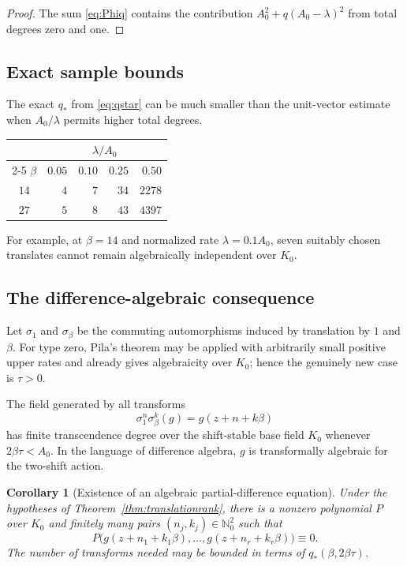 \documentclass[11pt,oneside]{article}
\newtheorem{corollary}[theorem]{Corollary}
\theoremstyle{definition}
\theoremstyle{remark}
\newcommand{\Nzero}{\mathbb N_0}
\begin{document}
\begin{proof}
The sum \eqref{eq:Phiq} contains the contribution
$A_0^2+q(A_0-\lambda)^2$ from total degrees zero and one.
\end{proof}

\subsection{Exact sample bounds}

The exact $q_*$ from \eqref{eq:qstar} can be much smaller than the unit-vector estimate
when $A_0/\lambda$ permits higher total degrees.

\begin{center}
\begin{tabular}{@{}crrrr@{}}
\toprule
& \multicolumn{4}{c}{$\lambda/A_0$}\\
\cmidrule(l){2-5}
$\beta$ & $0.05$ & $0.10$ & $0.25$ & $0.50$\\
\midrule
$14$ & $4$ & $7$ & $34$ & $2278$\\
$27$ & $5$ & $8$ & $43$ & $4397$\\
\bottomrule
\end{tabular}
\end{center}

For example, at $\beta=14$ and normalized rate $\lambda=0.1A_0$, seven suitably chosen
translates cannot remain algebraically independent over $K_0$.

\subsection{The difference-algebraic consequence}

Let $\sigma_1$ and $\sigma_\beta$ be the commuting automorphisms induced by translation by
$1$ and $\beta$.  For type zero, Pila's theorem may be applied with arbitrarily small positive upper rates and already gives algebraicity over $K_0$; hence the genuinely new case is $\tau>0$.

The field generated by all transforms
\[
 \sigma_1^n\sigma_\beta^k(g)=g(z+n+k\beta)
\]
has finite transcendence degree over the shift-stable base field $K_0$ whenever
$2\beta\tau<A_0$.  In the language of difference algebra, $g$ is transformally algebraic
for the two-shift action.

\begin{corollary}[Existence of an algebraic partial-difference equation]
\label{cor:algdifference}
Under the hypotheses of Theorem~\ref{thm:translationrank}, there is a nonzero polynomial
$P$ over $K_0$ and finitely many pairs $(n_j,k_j)\in\Nzero^2$ such that
\begin{equation}
 P\bigl(g(z+n_1+k_1\beta),\dots,
       g(z+n_r+k_r\beta)\bigr)\equiv0.
 \label{eq:partialdifference}
\end{equation}
The number of transforms needed may be bounded in terms of
$q_*(\beta,2\beta\tau)$.
\end{corollary}
\end{document}

